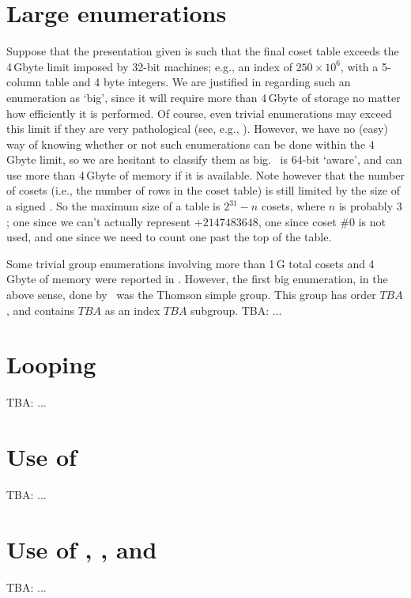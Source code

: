 \section{Large enumerations}

Suppose that the presentation given is such that the final coset table
  exceeds the 4\,Gbyte limit imposed by 32-bit machines; e.g., an index of
  $250 \times 10^6$\kern-2pt, with a 5-column table and 4 byte integers.
We are justified in regarding such an enumeration as `big'\kern-1.5pt, 
  since it will require more than 4\,Gbyte of storage no matter how
  efficiently it is performed.
Of course, even trivial enumerations may exceed this limit if they are
  very pathological (see, e.g., \cite{HR2}).
However, we have no (easy) way of knowing whether or not such enumerations
  can be done within the 4\,Gbyte limit, so we are hesitant to classify
  them as big.
\ace\ is 64-bit `aware'\kern-1.5pt, and can use more than 4\,Gbyte of
  memory if it is available.
Note however that the number of cosets (i.e., the number of rows in the
  coset table) is still limited by the size of a signed .
So the maximum size of a table is $2^{31} - n$ cosets, where $n$ is
  probably $3$; one since we can't actually represent $+2147483648$, one
  since coset \#0 is not used, and one since we need to count one past the
  top of the table.

Some trivial group enumerations involving more than 1\,G total cosets 
  and 4\,Gbyte of memory were reported in \cite{HR2}.
However, the first big enumeration, in the above sense, done by \ace\ was
  the Thomson simple group.
This group has order $TBA$, and contains $TBA$ as an index $TBA$ subgroup.
TBA: ...

\section{Looping}

TBA: ...

\section{Use of }\label{ex007}

TBA: ...

\section{Use of , ,  and } 

TBA: ...

